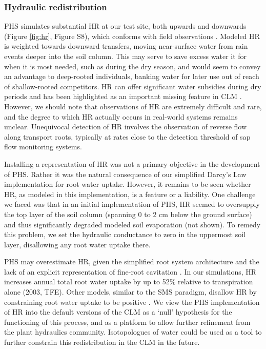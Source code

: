 \documentclass[draft,linenumbers]{agujournal}
\begin{document}
\subsubsection{Hydraulic redistribution}
\label{sect:hr}
PHS simulates substantial HR at our test site, both upwards and downwards (Figure \ref{fig:hr}, Figure S8), which conforms with field observations \citep{burgess1998,oliveira2005}.
    Modeled HR is weighted towards downward transfers, moving near-surface water from rain events deeper into the soil column. 
    This may serve to save excess water it for when it is most needed, such as during the dry season, 
    and would seem to convey an advantage to deep-rooted individuals, banking water for later use out of reach of shallow-rooted competitors.
    HR can offer significant water subsidies during dry periods \citep{jackson2000} and has been highlighted as an important missing feature in CLM \citep{lee2005,tang2015}. 
    However, we should note that observations of HR are extremely difficult and rare, and the degree to which HR actually occurs in real-world systems remains unclear. 
    Unequivocal detection of HR involves the observation of reverse flow along transport roots, typically at rates close to the detection threshold of sap flow monitoring systems. 
    
    Installing a representation of HR was not a primary objective in the development of PHS.
    Rather it was the natural consequence of our simplified Darcy's Law implementation for root water uptake.
    However, it remains to be seen whether HR, as modeled in this implementation, is a feature or a liability.
    One challenge we faced was that in an initial implementation of PHS, HR seemed to oversupply the top layer of the soil column (spanning 0 to 2 cm below the ground surface) and thus significantly degraded modeled soil evaporation (not shown). 
    To remedy this problem, we set the hydraulic conductance to zero in the uppermost soil layer, disallowing any root water uptake there.
    
    PHS may overestimate HR, given the simplified root system architecture \citep{bouda2017} 
    and the lack of an explicit representation of fine-root cavitation \citep{kotowska2015}.
    In our simulations, HR increases annual total root water uptake by up to 52\% relative to transpiration alone (2003, TFE). 
    Other models, similar to the SMS paradigm, disallow HR by constraining root water uptake to be positive \citep{xu2016}.
    We view the PHS implementation of HR into the default versions of the CLM as a `null' hypothesis for the functioning of this process, and as a platform to allow further refinement from the plant hydraulics community. 
    Isotopologues of water could be used as a tool to further constrain this redistribution in the CLM in the future. 
    
\end{document}

